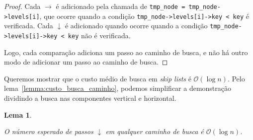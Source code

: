 \documentclass[paper=a4, fontsize=11pt]{scrartcl} %
\newtheorem{lemma}[theorem]{Lema}
\numberwithin{equation}{section}
\numberwithin{figure}{section}
\numberwithin{table}{section}
\numberwithin{definition}{section}
\numberwithin{theorem}{section}
\numberwithin{property}{section}
\numberwithin{proposition}{section}
\newcommand{\cO}{\ensuremath{\mathcal{O}}}
\newcommand{\sls}{\textit{skip lists}\xspace}
\begin{document}
\begin{proof}
Cada $\rightarrow$ é adicionado pela chamada de \verb|tmp_node = tmp_node->levels[i]|, que ocorre quando a condição
\verb|tmp_node->levels[i]->key < key| é verificada. 
Cada $\downarrow$ é adicionado quando ocorre quando a condição \verb|tmp_node->levels[i]->key < key| 
não é verificada.

Logo, cada comparação adiciona um passo ao caminho de busca, e não há outro modo de adicionar um passo ao
caminho de busca.
\end{proof}

Queremos mostrar que o custo médio de busca em \sls é $\cO(\log n)$. Pelo lema~\ref{lemma:custo_busca_caminho},
podemos simplificar a demonstração dividindo a busca nas componentes vertical e horizontal.

\begin{lemma} \label{lemma:downarrow}

O número esperado de passos $\downarrow$ em qualquer caminho de busca é $\cO(\log n)$.

\end{lemma}
\end{document}
